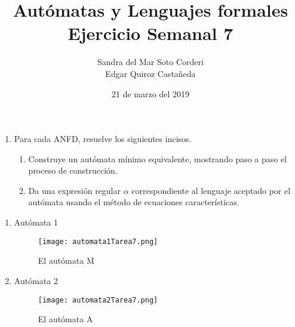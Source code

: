 \documentclass{article}
\begin{document}
    \title{
        Autómatas y Lenguajes formales \\
        Ejercicio Semanal 7
    }

    \author{
        Sandra del Mar Soto Corderi \\
        Edgar Quiroz Castañeda
    }

    \date{
        21 de marzo del 2019
    }
    
    \maketitle

    \begin{enumerate}
        \item {
            Para cada 	ANFD, resuelve los siguientes incisos.
            \begin{enumerate}
                \item Construye un autómata mínimo equivalente, mostrando paso a paso el proceso de construcción.
                
				\item Da una expresión regular $\alpha$ correspondiente al lenguaje aceptado por el autómata usando el método de ecuaciones características.
            \end{enumerate}
        }
       \end{enumerate}
    	\begin{enumerate}
    		\item {
    			Autómata 1
    			\begin{figure} [H]
    				\centering
    				\texttt{[image: automata1Tarea7.png]}
    				\caption{El autómata M}
    			\end{figure}
				}
    	
    	\item {
    		Autómata 2
    		\begin{figure} [H]
    			\centering
    			\texttt{[image: automata2Tarea7.png]}
    			\caption{El autómata A}
    		\end{figure}
    

    	}
    \end{enumerate}
\end{document}
